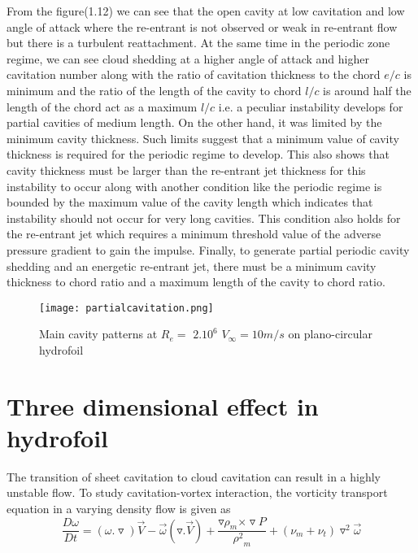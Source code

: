 From the figure(1.12) we can see that the open cavity at low
cavitation and low angle of attack where the re-entrant is not
observed or weak in re-entrant flow but there is a turbulent
reattachment. At the same time in the periodic zone regime, we can see
cloud shedding at a higher angle of attack and higher cavitation
number along with the ratio of cavitation thickness to the chord $e/c$
is minimum and the ratio of the length of the cavity to chord $l/c$ is
around half the length of the chord act as a maximum $l/c$ i.e. a
peculiar instability develops for partial cavities of medium
length. On the other hand, it was limited by the minimum cavity
thickness. Such limits suggest that a minimum value of cavity
thickness is required for the periodic regime to develop. This also
shows that cavity thickness must be larger than the re-entrant jet
thickness for this instability to occur along with another condition
like the periodic regime is bounded by the maximum value of the cavity
length which indicates that instability should not occur for very long
cavities. This condition also holds for the re-entrant jet which
requires a minimum threshold value of the adverse pressure gradient to
gain the impulse. Finally, to generate partial periodic cavity shedding 
and an energetic re-entrant jet, there must be a minimum cavity thickness
to chord ratio and a maximum length of the cavity to chord ratio. \\

\begin{figure}[H]
 \centering
 \texttt{[image: partialcavitation.png]}
 \caption{Main cavity patterns at $R_e =$ $2.{10}^6$ ${V_{\infty}}
   =10{m}/{s}$ on plano-circular hydrofoil \cite{FundamentalsofCavitation.2004}}
  \label{fig:fig12}
\end{figure}

\section{Three dimensional effect in hydrofoil}
The transition of sheet cavitation to cloud cavitation can result in a
highly unstable flow. To study cavitation-vortex
interaction\cite{JI2015}, the vorticity transport equation in a
varying density flow is given as
\begin{equation}
\frac{D\omega}{Dt}=({\omega.\triangledown})\vec{V}
-\vec{\omega}(\triangledown.\vec{V}) + \frac{{\triangledown{\rho}_m}
  {\times\triangledown P}}{{{\rho}^2}_m} +({\nu}_m
+{\nu}_t){{\triangledown}^2}\vec{\omega}
\end{equation}

